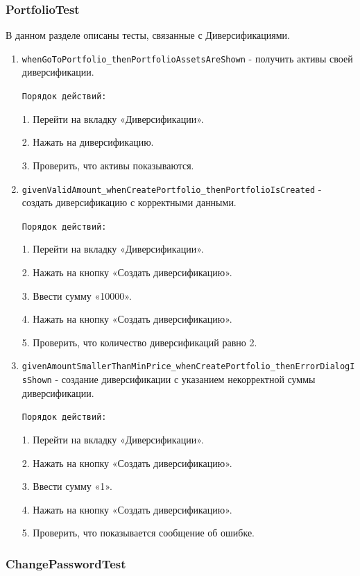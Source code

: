 \documentclass[a4paper, 14pt]{article}
\begin{document}
\subsubsection{PortfolioTest}

В данном разделе описаны тесты, связанные с Диверсификациями.

\begin{enumerate}
    \item \texttt{whenGoToPortfolio\_thenPortfolioAssetsAreShown} - получить активы своей диверсификации.

    \texttt{Порядок действий:}
    
    1. Перейти на вкладку «Диверсификации».
    
    2. Нажать на диверсификацию.

    3. Проверить, что активы показываются.
    \item \texttt{givenValidAmount\_whenCreatePortfolio\_thenPortfolioIsCreated} - создать диверсификацию с корректными данными.

    \texttt{Порядок действий:}
    
    1. Перейти на вкладку «Диверсификации».
    
    2. Нажать на кнопку «Создать диверсификацию».

    3. Ввести сумму «10000».

    4. Нажать на кнопку «Создать диверсификацию».

    5. Проверить, что количество диверсификаций равно 2.
    \item \texttt{givenAmountSmallerThanMinPrice\_whenCreatePortfolio\_thenErrorDialogIsShown} - создание диверсификации с указанием некорректной суммы диверсификации.

    \texttt{Порядок действий:}
    
    1. Перейти на вкладку «Диверсификации».
    
    2. Нажать на кнопку «Создать диверсификацию».

    3. Ввести сумму «1».

    4. Нажать на кнопку «Создать диверсификацию».

    5. Проверить, что показывается сообщение об ошибке.
    
\end{enumerate}

\subsubsection{ChangePasswordTest}
\end{document}
